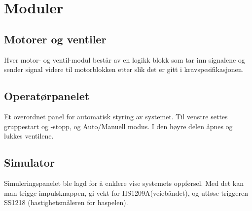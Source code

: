 \section{Moduler}
\subsection{Motorer og ventiler}
	Hver motor- og ventil-modul består av en logikk blokk som tar inn signalene og sender signal videre til motorblokken etter slik det er gitt i kravspesifikasjonen.

\subsection{Operatørpanelet}
	Et overordnet panel for automatisk styring av systemet. Til venstre settes gruppestart og -stopp, og Auto/Manuell modus. I den høyre delen åpnes og lukkes ventilene.

\subsection{Simulator}
	Simuleringspanelet ble lagd for å enklere vise systemets oppførsel. Med det kan man trigge impulsknappen, gi vekt for HS1209A(veiebåndet), og utløse triggeren SS1218 (hastighetsmåleren for haspelen).
